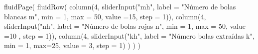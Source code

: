 \documentclass[
  letterpaper,
  DIV=11,
  numbers=noendperiod]{scrreprt}
\newenvironment{Shaded}{\begin{snugshade}}{\end{snugshade}}
\newcommand{\AttributeTok}[1]{\textcolor[rgb]{0.40,0.45,0.13}{#1}}
\newcommand{\DecValTok}[1]{\textcolor[rgb]{0.68,0.00,0.00}{#1}}
\newcommand{\FunctionTok}[1]{\textcolor[rgb]{0.28,0.35,0.67}{#1}}
\newcommand{\NormalTok}[1]{\textcolor[rgb]{0.00,0.23,0.31}{#1}}
\newcommand{\StringTok}[1]{\textcolor[rgb]{0.13,0.47,0.30}{#1}}
\begin{document}
\begin{Shaded}
\begin{Highlighting}[]
\FunctionTok{fluidPage}\NormalTok{(}
\FunctionTok{fluidRow}\NormalTok{(}
  \FunctionTok{column}\NormalTok{(}\DecValTok{4}\NormalTok{,}
         \FunctionTok{sliderInput}\NormalTok{(}\StringTok{"mh"}\NormalTok{, }\AttributeTok{label =} \StringTok{"Número de bolas blancas m"}\NormalTok{,}
              \AttributeTok{min =} \DecValTok{1}\NormalTok{, }\AttributeTok{max =} \DecValTok{50}\NormalTok{, }\AttributeTok{value =}\DecValTok{15}\NormalTok{, }\AttributeTok{step =} \DecValTok{1}\NormalTok{)),}
  \FunctionTok{column}\NormalTok{(}\DecValTok{4}\NormalTok{,}
         \FunctionTok{sliderInput}\NormalTok{(}\StringTok{"nh"}\NormalTok{, }\AttributeTok{label =} \StringTok{"Número de bolas rojas n"}\NormalTok{,}
              \AttributeTok{min =} \DecValTok{1}\NormalTok{, }\AttributeTok{max =} \DecValTok{50}\NormalTok{, }\AttributeTok{value =}\DecValTok{10}\NormalTok{ , }\AttributeTok{step =} \DecValTok{1}\NormalTok{)),}
  \FunctionTok{column}\NormalTok{(}\DecValTok{4}\NormalTok{,}
          \FunctionTok{sliderInput}\NormalTok{(}\StringTok{"kh"}\NormalTok{, }\AttributeTok{label =} \StringTok{"Número bolas extraídas k"}\NormalTok{,}
                     \AttributeTok{min =} \DecValTok{1}\NormalTok{, }\AttributeTok{max=}\DecValTok{25}\NormalTok{, }\AttributeTok{value =} \DecValTok{3}\NormalTok{, }\AttributeTok{step =} \DecValTok{1}\NormalTok{)}
\NormalTok{         )}
\NormalTok{  )}
\NormalTok{)}


\end{Highlighting}
\end{Shaded}
\end{document}
